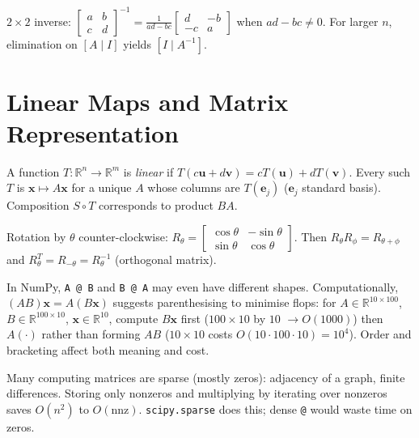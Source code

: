 $2\times2$ inverse: $\begin{bmatrix}a&b\\c&d\end{bmatrix}^{-1}=\frac1{ad-bc}\begin{bmatrix}d&-b\\-c&a\end{bmatrix}$ when $ad-bc\neq0$. For larger $n$, elimination on $[A\mid I]$ yields $[I\mid A^{-1}]$.

\section{Linear Maps and Matrix Representation}
\label{sec:linmap-detail}
A function $T:\mathbb{R}^n\to\mathbb{R}^m$ is \emph{linear} if $T(c\mathbf{u}+d\mathbf{v})=cT(\mathbf{u})+dT(\mathbf{v})$. Every such $T$ is $\mathbf{x}\mapsto A\mathbf{x}$ for a unique $A$ whose columns are $T(\mathbf{e}_j)$ ($\mathbf{e}_j$ standard basis). Composition $S\circ T$ corresponds to product $BA$.

\begin{example}
Rotation by $\theta$ counter-clockwise: $R_\theta=\begin{bmatrix}\cos\theta&-\sin\theta\\\sin\theta&\cos\theta\end{bmatrix}$. Then $R_\theta R_\phi=R_{\theta+\phi}$ and $R_\theta^T=R_{-\theta}=R_\theta^{-1}$ (orthogonal matrix).
\end{example}



\begin{remark}
In NumPy, \texttt{A @ B} and \texttt{B @ A} may even have different shapes. Computationally, $(AB)\mathbf{x}=A(B\mathbf{x})$ suggests parenthesising to minimise flops: for $A\in\mathbb{R}^{10\times100}$, $B\in\mathbb{R}^{100\times10}$, $\mathbf{x}\in\mathbb{R}^{10}$, compute $B\mathbf{x}$ first ($100\times10$ by $10$ $\to O(1000)$) then $A(\cdot)$ rather than forming $AB$ ($10\times10$ costs $O(10\cdot100\cdot10)=10^4$). Order and bracketing affect both meaning and cost.
\end{remark}

\begin{example}
Many computing matrices are sparse (mostly zeros): adjacency of a graph, finite differences. Storing only nonzeros and multiplying by iterating over nonzeros saves $O(n^2)$ to $O(\text{nnz})$. \texttt{scipy.sparse} does this; dense \texttt{@} would waste time on zeros.
\end{example}



